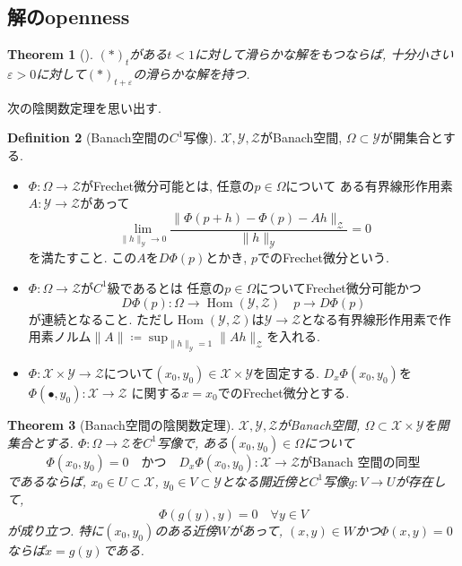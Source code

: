 \documentclass[dvipdfmx,a4paper,11pt]{article} %
\newtheorem{thm}{Theorem}[section]
\theoremstyle{definition}
\newtheorem{defn}[thm]{Definition}
\theoremstyle{remark}
\numberwithin{equation}{section}
\begin{document}
\subsection{解のopenness}

\begin{thm}[{\cite[Lemma 3.3]{Sze14}}]
\label{thm-open-2}
$(*)_t$がある$t<1$に対して滑らかな解をもつならば, 
十分小さい$\varepsilon>0$に対して$(*)_{t+\varepsilon}$の滑らかな解を持つ. 
\end{thm}


次の陰関数定理を思い出す.
\begin{defn}[Banach空間の$C^1$写像]
$\mathcal{X}, \mathcal{Y}, \mathcal{Z}$がBanach空間, $\Omega \subset \mathcal{Y}$が開集合とする. 
\begin{itemize}
\item $\Phi \colon \Omega \to \mathcal{Z}$がFrechet微分可能とは, 任意の$p \in \Omega$について
ある有界線形作用素$A \colon \mathcal{Y} \to \mathcal{Z}$があって
\[
\lim_{\lVert h\rVert_{\mathcal{Y}} \to 0}
\frac{\lVert \Phi(p+h) - \Phi(p) - Ah\rVert_{\mathcal{Z}}}{\lVert h\rVert_{\mathcal{Y}}}
=0
\]
を満たすこと. 
この$A$を$D\Phi(p)$とかき, $p$でのFrechet微分という. 
\item $\Phi \colon \Omega \to \mathcal{Z}$が$C^1$級であるとは
 任意の$p \in \Omega$についてFrechet微分可能かつ
 \[
D\Phi(p) \colon \Omega \to \operatorname{Hom}(\mathcal{Y}, \mathcal{Z})
\quad
p \to D\Phi(p)
 \]
 が連続となること. ただし$\operatorname{Hom}(\mathcal{Y}, \mathcal{Z})$は$\mathcal{Y} \to \mathcal{Z}$となる有界線形作用素で作用素ノルム$\lVert A\rVert\coloneqq \sup_{\lVert h\rVert_{\mathcal{Y}} =1}\lVert Ah \rVert_{\mathcal{Z}}$を入れる. 
 \item $\Phi \colon \mathcal{X} \times  \mathcal{Y} \to \mathcal{Z}$について$(x_0, y_0) \in \mathcal{X} \times \mathcal{Y}$を固定する. 
 $D_{x}\Phi(x_0, y_0)$を
 $
\Phi(\bullet, y_0) \colon \mathcal{X}\to \mathcal{Z}
 $
 に関する$x=x_0$でのFrechet微分とする. 
\end{itemize}
\end{defn}

\begin{thm}[Banach空間の陰関数定理]
\label{thm-implicit-theorem}
$\mathcal{X}, \mathcal{Y}, \mathcal{Z}$がBanach空間, $\Omega \subset \mathcal{X} \times \mathcal{Y}$を開集合とする. 
$\Phi \colon \Omega \to \mathcal{Z}$を$C^1$写像で, ある$(x_0, y_0) \in \Omega$について
\[
\Phi(x_0, y_0)=0 \quad \text{かつ} \quad
D_{x}\Phi(x_0, y_0) \colon \mathcal{X} \to \mathcal{Z} \text{がBanach 空間の同型}
\]
であるならば,  $x_0 \in U \subset \mathcal{X}$, $y_0 \in V \subset \mathcal{Y}$となる開近傍と$C^1$写像$g \colon V \to U$が存在して, 
\[
\Phi(g(y), y ) = 0 \quad \forall y \in V
\]
が成り立つ. 特に$(x_0, y_0)$のある近傍$W$があって, $(x,y) \in W$かつ$\Phi(x,y)=0$ならば$x = g(y)$である. 
\end{thm}
\end{document}
